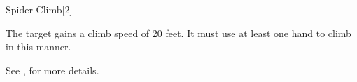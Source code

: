 \begin{spellsection}{Spider Climb}[2]
    \begin{spellheader}
    \end{spellheader}
    \begin{spellcontent}
        \begin{spelltargetinginfo}
        \end{spelltargetinginfo}
        \begin{spelleffects}
            \spelleffect The target gains a climb speed of 20 feet. It must use at least one hand to climb in this manner.
            \spelldur \durmed
        \end{spelleffects}
    \end{spellcontent}
    \begin{spellfooter}
        \spellnotes See , for more details.
        \miscastexplode
    \end{spellfooter}
\end{spellsection}


